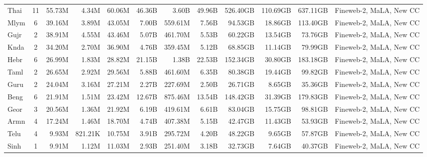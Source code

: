 \begin{table*}[!htp]
{\begin{tabular}{l|c|rrr|rrr|rrr|l}
Thai                    & 11                       & 55.73M   & 4.34M    & 60.06M  & 46.36B  & 3.60B   & 49.96B  & 526.40GB & 110.69GB & 637.11GB & Fineweb-2, MaLA, New CC         \\
Mlym                    & 6                        & 39.16M   & 3.89M    & 43.05M  & 7.00B   & 559.61M & 7.56B   & 94.53GB  & 18.86GB  & 113.40GB & Fineweb-2, MaLA, New CC         \\
Gujr                    & 2                        & 38.91M   & 4.55M    & 43.46M  & 5.07B   & 461.70M & 5.53B   & 60.22GB  & 13.54GB  & 73.76GB  & Fineweb-2, MaLA, New CC         \\
Knda                    & 2                        & 34.20M   & 2.70M    & 36.90M  & 4.76B   & 359.45M & 5.12B   & 68.85GB  & 11.14GB  & 79.99GB  & Fineweb-2, MaLA, New CC         \\
Hebr                    & 6                        & 26.99M   & 1.83M    & 28.82M  & 21.15B  & 1.38B   & 22.53B  & 152.34GB & 30.80GB  & 183.18GB & Fineweb-2, MaLA, New CC         \\
Taml                    & 2                        & 26.65M   & 2.92M    & 29.56M  & 5.88B   & 461.60M & 6.35B   & 80.38GB  & 19.44GB  & 99.82GB  & Fineweb-2, MaLA, New CC         \\
Guru                    & 2                        & 24.04M   & 3.16M    & 27.21M  & 2.27B   & 227.69M & 2.50B   & 26.71GB  & 8.65GB   & 35.36GB  & Fineweb-2, MaLA, New CC         \\
Beng                    & 6                        & 21.91M   & 1.51M    & 23.42M  & 12.67B  & 875.46M & 13.54B  & 148.42GB & 31.39GB  & 179.83GB & Fineweb-2, MaLA, New CC         \\
Geor                    & 3                        & 20.56M   & 1.36M    & 21.92M  & 6.19B   & 419.61M & 6.61B   & 83.04GB  & 15.75GB  & 98.81GB  & Fineweb-2, MaLA, New CC         \\
Armn                    & 4                        & 17.24M   & 1.46M    & 18.70M  & 4.74B   & 407.38M & 5.15B   & 42.47GB  & 11.43GB  & 53.93GB  & Fineweb-2, MaLA, New CC         \\
Telu                    & 4                        & 9.93M    & 821.21K  & 10.75M  & 3.91B   & 295.72M & 4.20B   & 48.22GB  & 9.65GB   & 57.87GB  & Fineweb-2, MaLA, New CC         \\
Sinh                    & 1                        & 9.91M    & 1.12M    & 11.03M  & 2.93B   & 251.40M & 3.18B   & 32.73GB  & 7.64GB   & 40.37GB  & Fineweb-2, MaLA, New CC         \\

\end{tabular}}
\end{table*}
